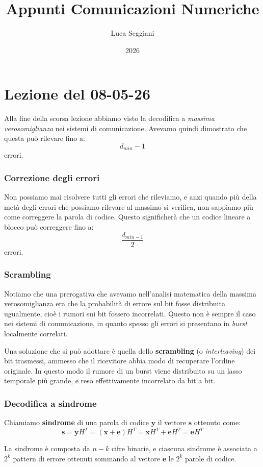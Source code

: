 \documentclass[a4paper,11pt]{article}
\title{Appunti Comunicazioni Numeriche}
\author{Luca Seggiani}
\date{2026}
\begin{document}
\section{Lezione del 08-05-26}

\thispagestyle{empty}
\pagestyle{fancy}

Alla fine della scorsa lezione abbiamo visto la decodifica a \textit{massima verosomiglianza} nei sistemi di comunicazione. Avevamo quindi dimostrato che questa può rilevare fino a:
$$
d_{min} - 1
$$
errori.

\subsubsection{Correzione degli errori}
Non possiamo mai risolvere tutti gli errori che rileviamo, e anzi quando più della metà degli errori che possiamo rilevare al massimo si verifica, non sappiamo più come correggere la parola di codice. Questo significherà che un codice lineare a blocco può correggere fino a:
$$
\frac{d_{min - 1}}{2}
$$
errori.

\subsubsection{Scrambling}
Notiamo che una prerogativa che avevamo nell'analisi matematica della massima verosomiglianza era che la probabilità di errore sul bit fosse distribuita ugualmente, cioè i rumori sui bit fossero incorrelati. Questo non è sempre il caso nei sistemi di comunicazione, in quanto spesso gli errori si presentano in \textit{burst} localmente correlati.

Una soluzione che si può adottare è quella dello \textbf{scrambling} (o \textit{interleaving}) dei bit trasmessi, ammesso che il ricevitore abbia modo di recuperare l'ordine originale. In questo modo il rumore di un burst viene distribuito su un lasso temporale più grande, e reso effettivamente incorrelato da bit a bit.

\subsubsection{Decodifica a sindrome}
Chiamiamo \textbf{sindrome} di una parola di codice $\mathbf{y}$ il vettore $\mathbf{s}$ ottenuto come:
$$
\mathbf{s} = \mathbf{y} H^T = (\mathbf{x} + \mathbf{e})H^T = \mathbf{x} H^T + \mathbf{e} H^T = \mathbf{e} H^T
$$

La sindrome è composta da $n-k$ cifre binarie, e ciascuna sindrome è associata a $2^k$ pattern di errore ottenuti sommando al vettore $\mathbf{e}$ le $2^k$ parole di codice.
\end{document}
